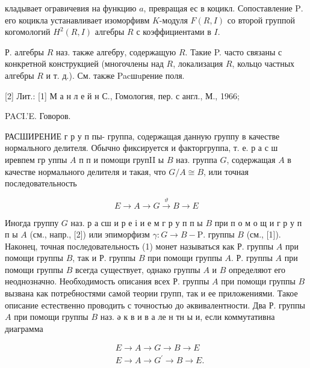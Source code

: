 \documentclass[10pt]{article}
\begin{document}
кладывает огравичевия на функцию $a$, превращая ес в коцикл. Сопоставление $\mathrm{P}$. его коцикла устанавливает изоморфивм $K$-модуля $F(R, I)$ со второй группой когомологий $H^{2}(R, I)$ алгебры $R$ с коэффициентами в $I$.



Р. алгебры $R$ наз. также алгебру, содержащую $R$. Такие P. часто связаны с конкретной конструкцией (многочлены над $R$, локализация $R$, кольцо частных алгебры $R$ и т. д.). См. также Pacшuрение поля.



[2] Лит.: [1] М а н л е й н С., Гомология, пер. с англ., М., 1966;



PACI.'E. Говоров.



РАСШИРЕНИЕ г р у п пы- группа, содержащая данную группу в качестве нормального делителя. Обычно фиксируется и факторгруппа, т. е. р а с ш иревпем гр уппы $A$ п п и помощи групII ы $B$ наз. группа $G$, содержащая $A$ в качестве нормального делителя и такая, что $G / A \cong B$, или точная последовательность



\[

E \longrightarrow A \longrightarrow G \stackrel{\vartheta}{\longrightarrow} B \longrightarrow E

\]



Иногда группу $G$ наз. р а сш и р е і и е м г р у п п ы $B$ при п о м о щ и г р у п п ы $A$ (см., напр., [2]) или эпиморфизм $\gamma: G \rightarrow B-\mathrm{P}$. группы $B$ (см., [1]). Наконец, точная последовательность (1) монет называться как Р. группы $A$ при помощи группы $B$, так и Р. группы $B$ при помощи группы $A$. Р. группы $A$ при помощи группы $B$ всегда существует, однако группы $A$ и $B$ определяют его неоднозначно. Необходимость описания всех Р. группы $A$ при помощи группы $B$ вызвана как потребностями самой теории групп, так и ее приложениями. Такое описание естественно проводить с точностью до әквивалентности. Два Р. группы $A$ при помощи группы $B$ наз. ә к в и в а ле н тн ы и, если коммутативна диаграмма



\[

\begin{aligned}

& E \longrightarrow A \longrightarrow G \longrightarrow B \longrightarrow E \\

& E \rightarrow A \longrightarrow G^{\prime} \rightarrow B \rightarrow E .

\end{aligned}

\]
\end{document}
